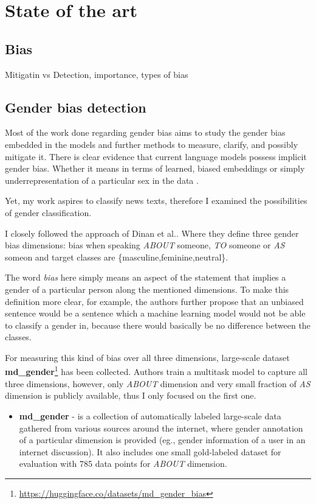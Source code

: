 \chapter{State of the art}

\section{Bias}
Mitigatin vs Detection, importance, types of bias
\section{Gender bias detection}
Most of the work done regarding gender bias aims to study the gender bias embedded in the models and further methods to measure, clarify, and possibly mitigate it.
There is clear evidence that current language models possess implicit gender bias. Whether it means in terms of learned, biased embeddings \cite{bolukbasi2016man} or simply underrepresentation of a particular sex in the data \cite{sun-peng-2021-men}. 

Yet, my work aspires to classify news texts, therefore I examined the possibilities of gender classification.

I closely followed the approach of Dinan et al.\cite{dinan2020multi}. Where they define three gender bias dimensions: bias when speaking \textit{ABOUT} someone, \textit{TO} someone or \textit{AS} someon and target classes are \{masculine,feminine,neutral\}. 

The word \textit{bias} here simply means an aspect of the statement that implies a gender of a particular person along the mentioned dimensions. To make this definition more clear, for example, the authors further propose that an unbiased sentence would be a sentence which a machine learning model would not be able to classify a gender in, because there would basically be no difference between the classes.

For measuring this kind of bias over all three dimensions, large-scale dataset \textbf{md\_gender}\footnote{\url{https://huggingface.co/datasets/md_gender_bias}} has been collected. Authors train a multitask model to capture all three dimensions, however, only \textit{ABOUT} dimension and very small fraction of \textit{AS} dimension is publicly available, thus I only focused on the first one.

\begin{itemize}
\item \textbf{md\_gender} - is a collection of automatically labeled large-scale data gathered from various sources around the internet, where gender annotation of a particular dimension is provided (eg., gender information of a user in an internet discussion). It also includes one small gold-labeled dataset for evaluation with 785 data points for \textit{ABOUT} dimension.
\end{itemize}


